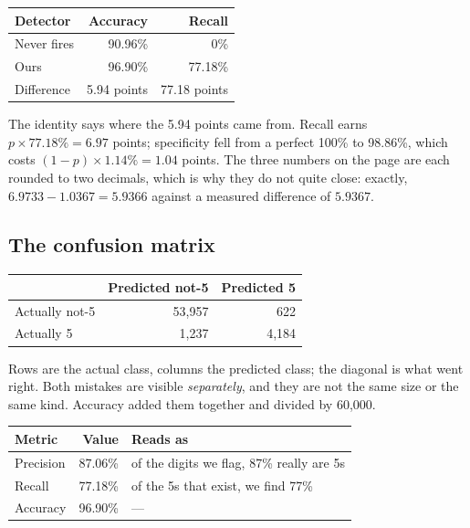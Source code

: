 \documentclass[11pt,a4paper]{article}
\begin{document}
\begin{center}
\small
\begin{tabular}{lrr}
\toprule
\textbf{Detector} & \textbf{Accuracy} & \textbf{Recall} \\
\midrule
Never fires & 90.96\% & 0\% \\
Ours        & 96.90\% & 77.18\% \\
Difference  & 5.94 points & 77.18 points \\
\bottomrule
\end{tabular}
\end{center}

The identity says where the 5.94 points came from. Recall earns $p \times
77.18\% = 6.97$ points; specificity fell from a perfect 100\% to 98.86\%, which
costs $(1-p) \times 1.14\% = 1.04$ points. The three numbers on the page are
each rounded to two decimals, which is why they do not quite close: exactly,
$6.9733 - 1.0367 = 5.9366$ against a measured difference of $5.9367$.

\subsection{The confusion matrix}

\begin{center}
\small
\begin{tabular}{lrr}
\toprule
& \textbf{Predicted not-5} & \textbf{Predicted 5} \\
\midrule
Actually not-5 & 53{,}957 & 622 \\
Actually 5     & 1{,}237  & 4{,}184 \\
\bottomrule
\end{tabular}
\end{center}

Rows are the actual class, columns the predicted class; the diagonal is what
went right. Both mistakes are visible \emph{separately}, and they are not the
same size or the same kind. Accuracy added them together and divided by
60{,}000.

\begin{center}
\small
\begin{tabular}{lrp{}}
\toprule
\textbf{Metric} & \textbf{Value} & \textbf{Reads as} \\
\midrule
Precision & 87.06\% & of the digits we flag, 87\% really are 5s \\
Recall    & 77.18\% & of the 5s that exist, we find 77\% \\
Accuracy  & 96.90\% & --- \\
\bottomrule
\end{tabular}
\end{center}
\end{document}
